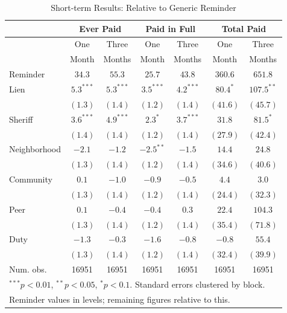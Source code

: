 \documentclass[12pt]{article}
\begin{document}
\begin{table}[htbp]
\caption{Short-term Results: Relative to Generic Reminder}
\begin{center}
\begin{tabular}{l c c c c c c }
\hline
 & \multicolumn{2}{c}{Ever Paid} & \multicolumn{2}{c}{Paid in Full} & \multicolumn{2}{c}{Total Paid} \\
 \hline
  & One  & Three  & One & Three  & One & Three \\
 & Month & Months & Month & Months & Month & Months \\
 \hline
Reminder     & $34.3$ & $55.3$ & $25.7$ & $43.8$ & $360.6$ & $651.8$ \\
\hline
Lien         & $5.3^{***}$  & $5.3^{***}$  & $3.5^{***}$  & $4.2^{***}$  & $80.4^{*}$    & $107.5^{**}$  \\
             & $(1.3)$      & $(1.4)$      & $(1.2)$      & $(1.4)$      & $(41.6)$      & $(45.7)$      \\
Sheriff      & $3.6^{***}$  & $4.9^{***}$  & $2.3^{*}$    & $3.7^{***}$  & $31.8$        & $81.5^{*}$    \\
             & $(1.4)$      & $(1.4)$      & $(1.2)$      & $(1.4)$      & $(27.9)$      & $(42.4)$      \\
Neighborhood & $-2.1$       & $-1.2$       & $-2.5^{**}$  & $-1.5$       & $14.4$        & $24.8$        \\
             & $(1.3)$      & $(1.4)$      & $(1.2)$      & $(1.4)$      & $(34.6)$      & $(40.6)$      \\
Community    & $0.1$        & $-1.0$       & $-0.9$       & $-0.5$       & $4.4$         & $3.0$         \\
             & $(1.3)$      & $(1.4)$      & $(1.2)$      & $(1.4)$      & $(24.4)$      & $(32.3)$      \\
Peer         & $0.1$        & $-0.4$       & $-0.4$       & $0.3$        & $22.4$        & $104.3$       \\
             & $(1.3)$      & $(1.4)$      & $(1.2)$      & $(1.4)$      & $(35.4)$      & $(71.8)$      \\
Duty         & $-1.3$       & $-0.3$       & $-1.6$       & $-0.8$       & $-0.8$        & $55.4$        \\
             & $(1.3)$      & $(1.4)$      & $(1.2)$      & $(1.4)$      & $(32.4)$      & $(39.9)$      \\
\hline
Num. obs.    & 16951        & 16951        & 16951        & 16951        & 16951         & 16951         \\
\hline
\multicolumn{7}{l}{\scriptsize{$^{***}p<0.01$, $^{**}p<0.05$, $^*p<0.1$. Standard errors clustered by block.}}\\
\multicolumn{7}{l}{\scriptsize{Reminder values in levels; remaining figures relative to this.}}
\end{tabular}
\label{sh_lpm_rob}
\end{center}
\end{table}
\end{document}
